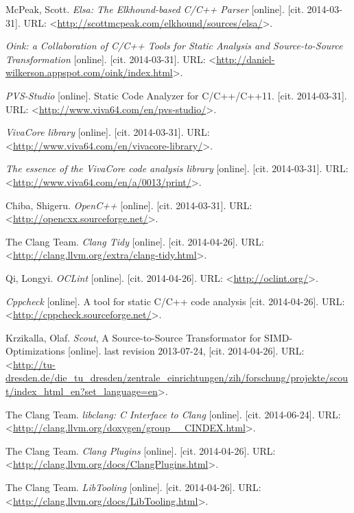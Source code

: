 \begin{thebibliography}{99}
	{\sc McPeak}, Scott.
	\emph{Elsa: The Elkhound-based C/C++ Parser} [online].
	[cit. 2014-03-31].
	URL: <\url{http://scottmcpeak.com/elkhound/sources/elsa/}>.
	
	\emph{Oink: a Collaboration of C/C++ Tools for Static Analysis and Source-to-Source Transformation} [online].
	[cit. 2014-03-31].
	URL: <\url{http://daniel-wilkerson.appspot.com/oink/index.html}>.
	
	\emph{PVS-Studio} [online].
	Static Code Analyzer for C/C++/C++11.
	[cit. 2014-03-31].
	URL: <\url{http://www.viva64.com/en/pvs-studio/}>.	
	
	\emph{VivaCore library} [online].
	[cit. 2014-03-31].
	URL: <\url{http://www.viva64.com/en/vivacore-library/}>.
	
	\emph{The essence of the VivaCore code analysis library} [online].
	[cit. 2014-03-31].
	URL: <\url{http://www.viva64.com/en/a/0013/print/}>.

	{\sc Chiba}, Shigeru.
	\emph{OpenC++} [online].
	[cit. 2014-03-31].
	URL: <\url{http://opencxx.sourceforge.net/}>.
	
	{\sc The Clang Team}.
	\emph{Clang Tidy} [online].
	[cit. 2014-04-26].
	URL: <\url{http://clang.llvm.org/extra/clang-tidy.html}>.
	
	{\sc Qi}, Longyi.
	\emph{OCLint} [online].
	[cit. 2014-04-26].
	URL: <\url{http://oclint.org/}>.
	
	\emph{Cppcheck} [online].
	A tool for static C/C++ code analysis [cit. 2014-04-26].
	URL: <\url{http://cppcheck.sourceforge.net/}>.
	
	{\sc Krzikalla}, Olaf.
	\emph{Scout}, A Source-to-Source Transformator for SIMD-Optimizations [online].
	last revision 2013-07-24, [cit. 2014-04-26].
	URL: <\url{http://tu-dresden.de/die_tu_dresden/zentrale_einrichtungen/zih/forschung/projekte/scout/index_html_en?set_language=en}>.
	
	{\sc The Clang Team}.
	\emph{libclang: C Interface to Clang} [online].
	[cit. 2014-06-24].
	URL: <\url{http://clang.llvm.org/doxygen/group__CINDEX.html}>.
	
	{\sc The Clang Team}.
	\emph{Clang Plugins} [online].
	[cit. 2014-04-26].
	URL: <\url{http://clang.llvm.org/docs/ClangPlugins.html}>.
	
	{\sc The Clang Team}.
	\emph{LibTooling} [online].
	[cit. 2014-04-26].
	URL: <\url{http://clang.llvm.org/docs/LibTooling.html}>.
	

\end{thebibliography}
